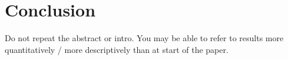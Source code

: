\section{Conclusion}
\label{sec:conclusion}
Do not repeat the abstract or intro.
You may be able to refer to results more quantitatively / more descriptively
than at start of the paper.